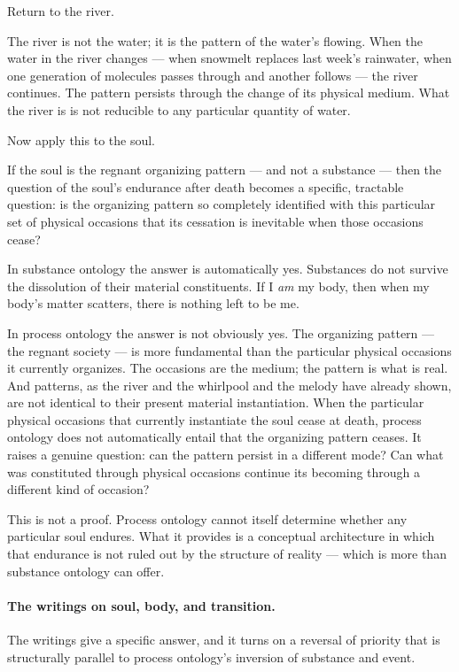 Return to the river.

The river is not the water; it is the pattern of the water's flowing.
When the water in the river changes --- when snowmelt replaces last week's
rainwater, when one generation of molecules passes through and another follows
--- the river continues.
The pattern persists through the change of its physical medium.
What the river is is not reducible to any particular quantity of water.

Now apply this to the soul.

If the soul is the regnant organizing pattern --- and not a substance ---
then the question of the soul's endurance after death becomes a specific,
tractable question: is the organizing pattern so completely identified with
this particular set of physical occasions that its cessation is inevitable
when those occasions cease?

In substance ontology the answer is automatically yes.
Substances do not survive the dissolution of their material constituents.
If I \emph{am} my body, then when my body's matter scatters, there is nothing
left to be me.

In process ontology the answer is not obviously yes.
The organizing pattern --- the regnant society --- is more fundamental than
the particular physical occasions it currently organizes.
The occasions are the medium; the pattern is what is real.
And patterns, as the river and the whirlpool and the melody have already
shown, are not identical to their present material instantiation.
When the particular physical occasions that currently instantiate the soul
cease at death, process ontology does not automatically entail that the
organizing pattern ceases.
It raises a genuine question: can the pattern persist in a different mode?
Can what was constituted through physical occasions continue its becoming
through a different kind of occasion?

This is not a proof.
Process ontology cannot itself determine whether any particular soul endures.
What it provides is a conceptual architecture in which that endurance is
not ruled out by the structure of reality --- which is more than substance
ontology can offer.

\paragraph{The \bahai{} writings on soul, body, and transition.}

The \bahai{} writings give a specific answer, and it turns on a reversal of
priority that is structurally parallel to process ontology's inversion of
substance and event.

